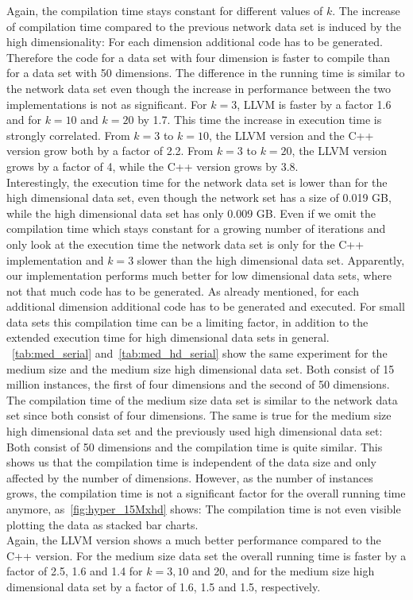 Again, the compilation time stays constant for different values of $k$. The increase of compilation time compared to the previous network data set is induced by the high dimensionality: For each dimension additional code has to be generated. Therefore the code for a data set with four dimension is faster to compile than for a data set with 50 dimensions. 
The difference in the running time is similar to the network data set even though the increase in performance between the two implementations is not as significant. For $k = 3$, LLVM is faster by a factor 1.6 and for $k = 10$ and $k = 20$ by 1.7. This time the increase in execution time is strongly correlated. From $k = 3$ to $k = 10$, the LLVM version and the C++ version grow both by a factor of 2.2. From $k = 3$ to $k = 20$, the LLVM version grows by a factor of 4, while the C++ version grows by 3.8.
\\
Interestingly, the execution time for the network data set is lower than for the high dimensional data set, even though the network set has a size of 0.019 GB, while the high dimensional data set has only 0.009 GB. Even if we omit the compilation time which stays constant for a growing number of iterations and only look at the execution time the network data set is only for the C++ implementation and $k = 3$ slower than the high dimensional data set. Apparently, our implementation performs much better for low dimensional data sets, where not that much code has to be generated. As already mentioned, for each additional dimension additional code has to be generated and executed. For small data sets this compilation time can be a limiting factor, in addition to the extended execution time for high dimensional data sets in general.
\\
~\autoref{tab:med_serial} and~\autoref{tab:med_hd_serial} show the same experiment for the medium size and the medium size high dimensional data set. Both consist of 15 million instances, the first of four dimensions and the second of 50 dimensions. The compilation time of the medium size data set is similar to the network data set since both consist of four dimensions. The same is true for the medium size high dimensional data set and the previously used high dimensional data set: Both consist of 50 dimensions and the compilation time is quite similar. This shows us that the compilation time is independent of the data size and only affected by the number of dimensions. However, as the number of instances grows, the compilation time is not a significant factor for the overall running time anymore, as~\autoref{fig:hyper_15Mxhd} shows: The compilation time is not even visible plotting the data as stacked bar charts. 
\\
Again, the LLVM version shows a much better performance compared to the C++ version. For the medium size data set the overall running time is faster by a factor of 2.5, 1.6 and 1.4 for $k = 3, 10$ and 20, and for the medium size high dimensional data set by a factor of 1.6, 1.5 and 1.5, respectively.

